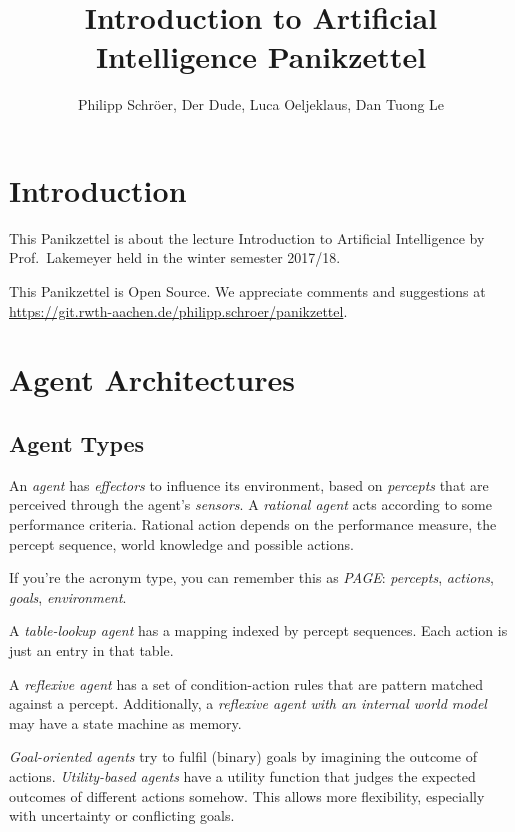 \documentclass[english]{panikzettel}
\title{Introduction to Artificial Intelligence Panikzettel}
\author{Philipp Schröer, Der Dude, Luca Oeljeklaus, Dan Tuong Le}
\begin{document}
\maketitle

\tableofcontents

\section{Introduction}

This Panikzettel is about the lecture Introduction to Artificial Intelligence by Prof.\ Lakemeyer held in the winter semester 2017/18.

This Panikzettel is Open Source. We appreciate comments and suggestions at \\ \url{https://git.rwth-aachen.de/philipp.schroer/panikzettel}.

\section{Agent Architectures}

\subsection{Agent Types}

An \emph{agent} has \emph{effectors} to influence its environment, based on \emph{percepts} that are perceived  through the agent's \emph{sensors}.
A \emph{rational agent} acts according to some performance criteria.
Rational action depends on the performance measure, the percept sequence, world knowledge and possible actions.

If you're the acronym type, you can remember this as \emph{PAGE}: \emph{percepts}, \emph{actions}, \emph{goals}, \emph{environment}.

A \emph{table-lookup agent} has a mapping indexed by percept sequences.
Each action is just an entry in that table.

A \emph{reflexive agent} has a set of condition-action rules that are pattern matched against a percept.
Additionally, a \emph{reflexive agent with an internal world model} may have a state machine as memory.

\emph{Goal-oriented agents} try to fulfil (binary) goals by imagining the outcome of actions.
\emph{Utility-based agents} have a utility function that judges the expected outcomes of different actions somehow.
This allows more flexibility, especially with uncertainty or conflicting goals.
\end{document}
